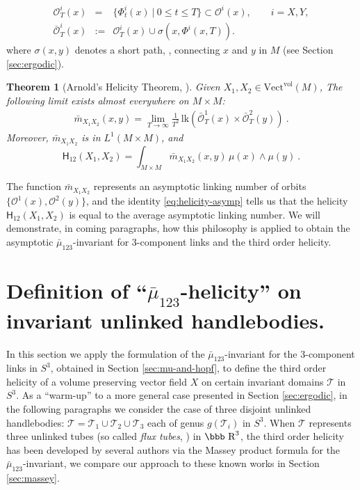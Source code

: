 \documentclass[12pt]{article}
\newtheorem{theorem}{Theorem}[section]
\newcommand{\R}{\mbox{\bbb R}}       %
\newcommand{\no}{\noindent}
\begin{document}
\begin{eqnarray}\label{eq:orbits}
 \mathscr{O}^i_T(x) & = & \{\Phi^i_t(x)\ |\ 0\leq t\leq T\}\subset \mathscr{O}^i(x),\qquad i=X, Y,\\
 \bar{\mathscr{O}}^i_T(x) & := & \mathscr{O}^i_T(x)\cup \sigma(x,\Phi^i(x,T)).
\end{eqnarray}
 where $\sigma(x,y)$ denotes a short path, \cite{Vogel03}, connecting $x$ and $y$ in $M$ (see Section \ref{sec:ergodic}).
 
\begin{theorem}[Arnold's Helicity Theorem, \cite{Arnold86}]
 Given $X_1, X_2\in\text{Vect}^\text{vol}(M)$,  The following 
 limit exists almost everywhere on $M\times M$:
 \begin{gather}\label{eq:linking-function}
  \bar{m}_{X_1 X_2}(x,y)=\lim_{T\to \infty} \frac{1}{T^2}\, \text{lk}(\bar{\mathscr{O}}^1_T(x)\times\bar{\mathscr{O}}^2_T(y))\ .
 \end{gather}
Moreover, $\bar{m}_{X_1 X_2}$ is in $L^1(M\times M)$, and 
\begin{equation}\label{eq:helicity-asymp}
 \mathsf{H}_{12}(X_1,X_2)=\int_{M\times M} \bar{m}_{X_1 X_2}(x,y)\, \mu(x)\wedge\mu(y)\ .
\end{equation}
\end{theorem}
\no The function $\bar{m}_{X_1 X_2}$ represents an asymptotic linking number of orbits $\{\mathscr{O}^1(x),\mathscr{O}^2(y)\}$, and the identity \eqref{eq:helicity-asymp} tells us that 
the helicity $\mathsf{H}_{12}(X_1,X_2)$ is equal to the average asymptotic linking number. We will demonstrate, in coming paragraphs, how this philosophy is applied to obtain the asymptotic $\bar{\mu}_{123}$-invariant for 
3-component links and the third order helicity.

\section{Definition of ``$\bar{\mu}_{123}$-helicity'' on invariant unlinked handlebodies.}\label{sec:handlebody}

\no In this section we apply the formulation of the $\bar{\mu}_{123}$-invariant for the 3-component links in $S^3$, 
obtained in Section \ref{sec:mu-and-hopf}, to define the third order helicity of a volume preserving vector field $X$ on certain invariant domains $\mathcal{T}$ in $S^3$. 
As a ``warm-up'' to a more general case presented in Section \ref{sec:ergodic}, in the following paragraphs we consider the case of three disjoint unlinked handlebodies: $\mathcal{T}=\mathcal{T}_1\cup 	\mathcal{T}_2\cup \mathcal{T}_3$ each of genus $g(\mathcal{T}_i)$ in $S^3$.
When $\mathcal{T}$ represents three unlinked tubes (so called \emph{flux tubes}, \cite{Khesin98}) in $\R^3$, the third order helicity has been developed by several authors \cite{Berger90,Mayer03,Laurence-Stredulinsky00b} via the Massey product formula for the $\bar{\mu}_{123}$-invariant, we compare our approach to these known works in Section \ref{sec:massey}.
\end{document}
